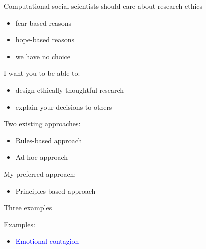 \documentclass{beamer}
\begin{document}
\begin{frame}

Computational social scientists should care about research ethics
\pause
\begin{itemize}
\item fear-based reasons
\pause
\item hope-based reasons
\pause
\item we have no choice
\end{itemize}

\end{frame}
\begin{frame}

I want you to be able to:
\begin{itemize}
\item design ethically thoughtful research
\pause 
\item explain your decisions to others
\end{itemize}
 
\end{frame}
%
%
\begin{frame}

Two existing approaches:
\begin{itemize}
\item Rules-based approach
\pause
\item Ad hoc approach
\end{itemize}

My preferred approach:
\begin{itemize}
\item Principles-based approach
\end{itemize}

\end{frame}
\begin{frame}

\begin{center}
\Large{Three examples}
\end{center}

\end{frame}
\begin{frame}

Examples:
\begin{itemize}
\item \textcolor{blue}{Emotional contagion}
\end{itemize}

\end{frame}
\end{document}
